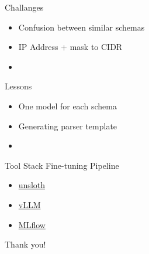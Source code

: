 \documentclass[aspectratio=169]{beamer}
\begin{document}
\begin{frame}{Challanges}

  \begin{itemize}
    \setlength\itemsep{1em}
    \item Confusion between similar schemas
    \item IP Address + mask to CIDR
    \item 
  \end{itemize}

\end{frame}

\begin{frame}{Lessons}

  \begin{itemize}
    \setlength\itemsep{1em}
    \item One model for each schema
    \item Generating parser template
    \item 
  \end{itemize}

\end{frame}

\begin{frame}{Tool Stack Fine-tuning Pipeline}

  \begin{itemize}
    \setlength\itemsep{1em}
    \item \href{https://github.com/unslothai/unsloth}{unsloth}
    \item \href{https://github.com/vllm-project/vllm}{vLLM}
    \item \href{https://github.com/mlflow/mlflow}{MLflow}
  \end{itemize}

\end{frame}

{
  \begin{frame}[plain,c]
    \begin{center}
      \Huge \color[rgb]{1,1,1}Thank you!
    \end{center}
  \end{frame}
}
\end{document}
